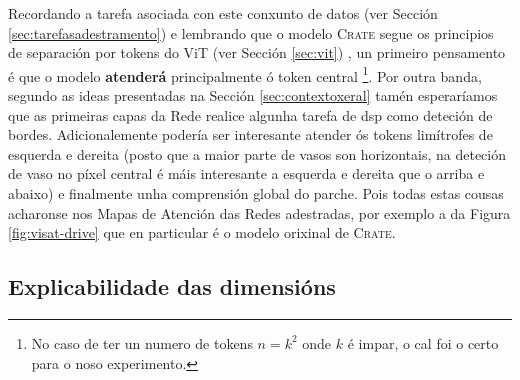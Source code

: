 Recordando a tarefa asociada con este conxunto de datos (ver Sección \ref{sec:tarefasadestramento}) e lembrando que o modelo \textsc{Crate} segue os principios de separación por \glspl{token} do ViT (ver Sección \ref{sec:vit}) , un primeiro pensamento é que o modelo \textbf{atenderá} principalmente ó \gls{token} central \footnote{No caso de ter un numero de \glspl{token} $n = k^2$ onde $k$ é impar, o cal foi o certo para o noso experimento.}. Por outra banda, segundo as ideas presentadas na Sección \ref{sec:contextoxeral} tamén esperaríamos que as primeiras capas da Rede realice algunha tarefa de \acrshort{dsp} como deteción de bordes. Adicionalemente podería ser interesante atender ós \glspl{token} limítrofes de esquerda e dereita (posto que a maior parte de vasos son horizontais, na deteción de vaso no \gls{píxel} central é máis interesante a esquerda e dereita que o arriba e abaixo) e finalmente unha comprensión global do parche. Pois todas estas cousas acharonse nos Mapas de Atención das Redes adestradas, por exemplo a da Figura \ref{fig:visat-drive} que en particular é o modelo orixinal de \textsc{Crate}.

\subsection{Explicabilidade das dimensións}
\label{sec:res-dimensions-drive}

